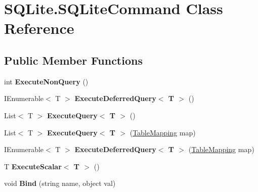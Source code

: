 \hypertarget{classSQLite_1_1SQLiteCommand}{}\section{S\+Q\+Lite.\+S\+Q\+Lite\+Command Class Reference}
\label{classSQLite_1_1SQLiteCommand}
\subsection*{Public Member Functions}
\begin{DoxyCompactItemize}
\item 
\hypertarget{classSQLite_1_1SQLiteCommand_a7a2b9afd67f691520b73bfb0efb18b9b}{}int {\bfseries Execute\+Non\+Query} ()\label{classSQLite_1_1SQLiteCommand_a7a2b9afd67f691520b73bfb0efb18b9b}

\item 
\hypertarget{classSQLite_1_1SQLiteCommand_a28f64ff5f495468d9f480bd5d1b4338d}{}I\+Enumerable$<$ T $>$ {\bfseries Execute\+Deferred\+Query$<$ T $>$} ()\label{classSQLite_1_1SQLiteCommand_a28f64ff5f495468d9f480bd5d1b4338d}

\item 
\hypertarget{classSQLite_1_1SQLiteCommand_a6aa1993738e35a863eea4c5d7cee212e}{}List$<$ T $>$ {\bfseries Execute\+Query$<$ T $>$} ()\label{classSQLite_1_1SQLiteCommand_a6aa1993738e35a863eea4c5d7cee212e}

\item 
\hypertarget{classSQLite_1_1SQLiteCommand_a89a1919e9f583731eaabaf12e1982e39}{}List$<$ T $>$ {\bfseries Execute\+Query$<$ T $>$} (\hyperlink{classSQLite_1_1TableMapping}{Table\+Mapping} map)\label{classSQLite_1_1SQLiteCommand_a89a1919e9f583731eaabaf12e1982e39}

\item 
\hypertarget{classSQLite_1_1SQLiteCommand_a092913169afcc6c9fdd9ae5e5ca7cf96}{}I\+Enumerable$<$ T $>$ {\bfseries Execute\+Deferred\+Query$<$ T $>$} (\hyperlink{classSQLite_1_1TableMapping}{Table\+Mapping} map)\label{classSQLite_1_1SQLiteCommand_a092913169afcc6c9fdd9ae5e5ca7cf96}

\item 
\hypertarget{classSQLite_1_1SQLiteCommand_a3ce415ca55779eaf3d1851060eff05cc}{}T {\bfseries Execute\+Scalar$<$ T $>$} ()\label{classSQLite_1_1SQLiteCommand_a3ce415ca55779eaf3d1851060eff05cc}

\item 
\hypertarget{classSQLite_1_1SQLiteCommand_adc2e4047e52cc3da0307a74e74e276f7}{}void {\bfseries Bind} (string name, object val)\label{classSQLite_1_1SQLiteCommand_adc2e4047e52cc3da0307a74e74e276f7}


\end{DoxyCompactItemize}
